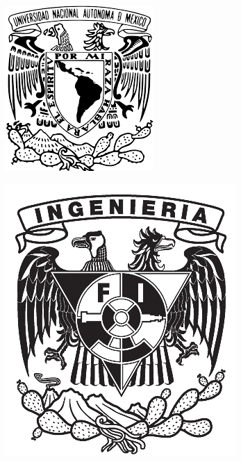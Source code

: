 	\begin{minipage}{0.48\textwidth}
	\begin{flushleft}
		\includegraphics[scale=0.5]{img/UNAM}
	\end{flushleft}
\end{minipage}
\begin{minipage}{0.48\textwidth}
	\begin{flushright}
		\includegraphics[scale=1.38]{img/fi_logo}
	\end{flushright}
\end{minipage}
